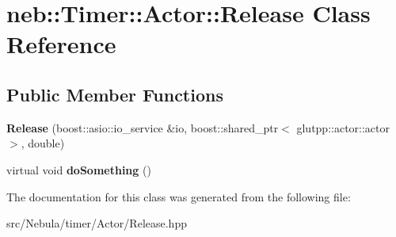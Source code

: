 \hypertarget{classneb_1_1Timer_1_1Actor_1_1Release}{\section{neb\-:\-:\-Timer\-:\-:\-Actor\-:\-:\-Release \-Class \-Reference}
\label{classneb_1_1Timer_1_1Actor_1_1Release}
}
\subsection*{\-Public \-Member \-Functions}
\begin{DoxyCompactItemize}
\item 
\hypertarget{classneb_1_1Timer_1_1Actor_1_1Release_aa6ad6ac8cf6b278825d5c66580c5b2fb}{{\bfseries \-Release} (boost\-::asio\-::io\-\_\-service \&io, boost\-::shared\-\_\-ptr$<$ glutpp\-::actor\-::actor $>$, double)}\label{classneb_1_1Timer_1_1Actor_1_1Release_aa6ad6ac8cf6b278825d5c66580c5b2fb}

\item 
\hypertarget{classneb_1_1Timer_1_1Actor_1_1Release_aba04f2d6b58f14b55dde7c0f1edeca20}{virtual void {\bfseries do\-Something} ()}\label{classneb_1_1Timer_1_1Actor_1_1Release_aba04f2d6b58f14b55dde7c0f1edeca20}

\end{DoxyCompactItemize}


\-The documentation for this class was generated from the following file\-:\begin{DoxyCompactItemize}
\item 
src/\-Nebula/timer/\-Actor/\-Release.\-hpp\end{DoxyCompactItemize}

